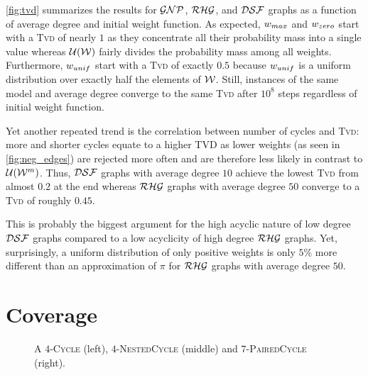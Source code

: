 \cref{fig:tvd} summarizes the results for $\mathcal{GNP}$, $\mathcal{RHG}$, and $\mathcal{DSF}$ graphs as a function of average degree and initial weight function.
  As expected, $w_{max}$ and $w_{zero}$ start with a \textsc{Tvd} of nearly $1$ as they concentrate all their probability mass into a single value whereas $\mathcal U(\mathcal W)$ fairly divides the probability mass among all weights.
Furthermore, $w_{unif}$ start with a \textsc{Tvd} of exactly $0.5$ because $w_{unif}$ is a uniform distribution over exactly half the elements of $\mathcal W$.
Still, instances of the same model and average degree converge to the same \textsc{Tvd} after $10^8$ steps regardless of initial weight function.

Yet another repeated trend is the correlation between number of cycles and \textsc{Tvd}: more and shorter cycles equate to a higher TVD as lower weights (as seen in \cref{fig:neg_edges}) are rejected more often and are therefore less likely in contrast to $\mathcal U(\mathcal W^m)$.
Thus, $\mathcal{DSF}$ graphs with average degree $10$ achieve the lowest \textsc{Tvd} from almost $0.2$ at the end whereas $\mathcal{RHG}$ graphs with average degree $50$ converge to a \textsc{Tvd} of roughly $0.45$.

This is probably the biggest argument for the high acyclic nature of low degree $\mathcal{DSF}$ graphs compared to a low acyclicity of high degree $\mathcal{RHG}$ graphs.
Yet, surprisingly, a uniform distribution of only positive weights is only $5\%$ more different than an approximation of $\pi$ for $\mathcal{RHG}$ graphs with average degree $50$.


\section{Coverage}\label{sec:exp_cov}
\begin{figure}[!tb]
  \centering
  
  \caption{
    A $4$-\textsc{Cycle} (left), $4$-\textsc{NestedCycle} (middle) and $7$-\textsc{PairedCycle} (right).
  }
  \label{fig:coverage_cyles}
\end{figure}


